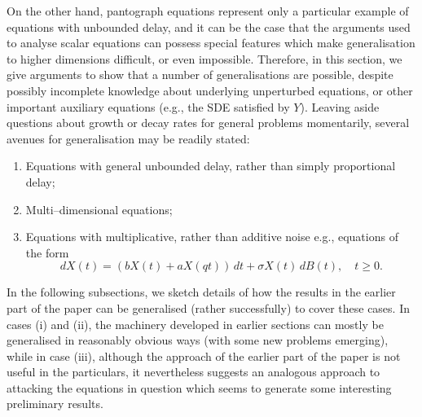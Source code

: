 \documentclass[a4paper,10pt,reqno]{amsart}
\numberwithin{equation}{section}
\theoremstyle{definition}
\theoremstyle{remark}
\DeclareMathOperator{\1}{\mathbbm 1}
\begin{document}
On the other hand, pantograph equations represent only a particular example of equations with unbounded delay, and it can be the case that the arguments used to analyse scalar equations can possess special features which make generalisation to higher dimensions difficult, or even impossible. Therefore, in this section, we give  arguments to show that a number of generalisations are possible, despite possibly incomplete knowledge about underlying unperturbed equations, or other important auxiliary equations (e.g., the SDE satisfied by $Y$). Leaving aside questions about growth or decay rates for general problems momentarily, several avenues for generalisation may be readily stated:
\begin{enumerate}
\item[(i)] Equations with general unbounded delay, rather than simply proportional delay;
\item[(ii)] Multi--dimensional equations;
\item[(iii)] Equations with multiplicative, rather than additive noise e.g., equations of the form 
\[
dX(t)=(bX(t)+aX(qt))\,dt + \sigma X(t)\,dB(t), \quad t\geq 0.
\]
\end{enumerate}   
In the following subsections, we sketch details of how the results in the earlier part of the paper can be generalised (rather successfully) to cover these cases. In cases (i) and (ii), the machinery developed in earlier sections can mostly be generalised in reasonably obvious ways (with some new problems emerging), while in case (iii), although the approach of the earlier part of the paper is not useful in the particulars, it  nevertheless suggests an analogous approach to attacking the equations in question which seems to generate some interesting preliminary results.    
\end{document}
